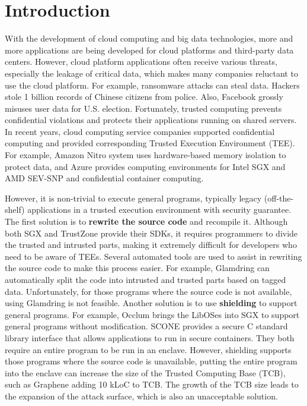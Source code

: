 \section{Introduction}
With the development of cloud computing and big data technologies,
more and more applications are being developed for cloud platforms
and third-party data centers. However, cloud platform applications
often receive various threats, especially the leakage of critical data,
which makes many companies reluctant to use the cloud platform.
For example, ransomware attacks can steal data.
Hackers stole 1 billion records of Chinese citizens from police.
Also, Facebook grossly misuses user data for U.S. election.
Fortunately, trusted computing prevents confidential violations and
protects their applications running on shared servers.
In recent years, cloud computing service companies supported confidential
computing and provided corresponding Trusted Execution Environment (TEE).
For example, Amazon Nitro system \cite{AmazonNitro} uses hardware-based memory
isolation to protect data, and Azure \cite{AzureDocs} provides computing environments
for Intel SGX and AMD SEV-SNP and confidential container computing.

However, it is non-trivial to execute general programs, typically legacy (off-the-shelf)
applications in a trusted execution environment with security guarantee.
The first solution is to \textbf{rewrite the source code} and recompile it.
Although both SGX and TrustZone provide their SDKs, it requires programmers
to divide the trusted and intrusted parts, making it extremely difficult for
developers who need to be aware of TEEs. Several automated tools are used to assist
in rewriting the source code to make this process easier.
For example, Glamdring \cite{Lind2017GlamdringAA} can automatically
split the code into intrusted and trusted parts based on tagged data.
Unfortunately, for those programs where the source code is not available,
using Glamdring is not feasible.
Another solution is to use \textbf{shielding} to support general programs.
For example, Occlum \cite{Shen2020OcclumSA} brings the LibOSes
into SGX to support general programs without modification. SCONE \cite{Arnautov2016SCONESL}
provides a secure C standard library interface that allows applications to
run in secure containers. They both require an entire program to be run in an enclave.
However, shielding supports those programs where the source code is unavailable,
putting the entire program into the enclave can increase the size of the
Trusted Computing Base (TCB), such as Graphene \cite{Tsai2017GrapheneSGXAP}
adding 10 kLoC to TCB.
The growth of the TCB size leads to the expansion of the attack surface,
which is also an unacceptable solution.


